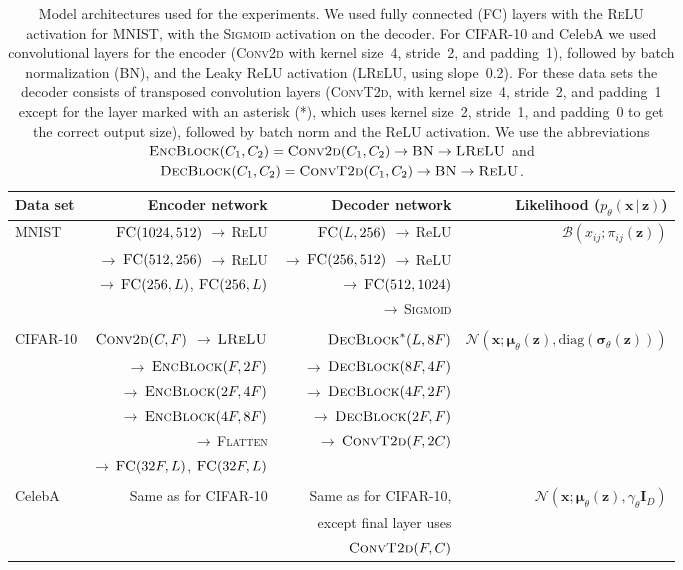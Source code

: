 \documentclass{article}
\newcommand{\bft}[1]{\mathbf{#1}}
\newcommand{\bfs}[1]{\boldsymbol{#1}}
\newcommand{\given}{\,|\,}
\begin{document}
\begin{table}[tb]
	\centering
	\caption{Model architectures used for the experiments. We used fully 
		connected (\textsc{FC}) layers with the \textsc{ReLU} 
		activation for MNIST, with the \textsc{Sigmoid} activation on 
		the decoder. For CIFAR-10 and CelebA we used convolutional 
		layers for the encoder (\textsc{Conv2d} with kernel size~4, 
		stride~2, and padding~1), followed by batch normalization 
		(\textsc{BN}), and the Leaky ReLU activation (\textsc{LReLU}, 
		using slope~0.2). For these data sets the decoder consists of 
		transposed convolution layers (\textsc{ConvT2d}, with kernel 
		size~4, stride~2, and padding~1 except for the layer marked 
		with an asterisk (*), which uses kernel size~2, stride~1, and 
		padding~0 to get the correct output size), followed by batch 
		norm and the ReLU activation.  We use the abbreviations 
		$\textsc{EncBlock}(C_1, C_2) = \textsc{Conv2d}(C_1, C_2) 
		\rightarrow \textsc{BN} \rightarrow \textsc{LReLU}$ and 
		$\textsc{DecBlock}(C_1, C_2) = \textsc{ConvT2d}(C_1, C_2) 
		\rightarrow \textsc{BN} \rightarrow \textsc{ReLU}$.}
	\label{tab:architectures}
	\def\RA{$\rightarrow\,$}
	\small
	\begin{tabular}{lrrr}
		\toprule
		Data set & Encoder network & Decoder network & Likelihood ($p_{\theta}(\bft{x} \given \bft{z})$) \\
		\midrule
		MNIST & $\textsc{FC}(1024, 512)$ \RA \textsc{ReLU} & $\textsc{FC}(L, 256)$ \RA ReLU & $\mathcal{B}(x_{ij}; \pi_{ij}(\bft{z}))$ \\
		      & \RA $\textsc{FC}(512, 256)$ \RA \textsc{ReLU} & \RA $\textsc{FC}(256, 512)$ \RA ReLU & \\
		      & \RA $\textsc{FC}(256, L)$, $\textsc{FC}(256, L)$ & \RA $\textsc{FC}(512, 1024)$ & \\
		      &                                                  & \RA \textsc{Sigmoid} & \\
		& & & \\
		CIFAR-10 & $\textsc{Conv2d}(C, F)$ \RA $\textsc{LReLU}$ & 
		$\textsc{DecBlock}^*(L, 8F)$ & $\mathcal{N}(\bft{x} ; 
		\bfs{\mu}_{\theta}(\bft{z}), 
		\text{diag}(\bfs{\sigma}_{\theta}(\bft{z})))$  \\
			 & \RA $\textsc{EncBlock}(F,  2F)$  & \RA $\textsc{DecBlock}(8F, 4F)$ & \\
			 & \RA $\textsc{EncBlock}(2F, 4F)$  & \RA $\textsc{DecBlock}(4F, 2F)$ & \\
			 & \RA $\textsc{EncBlock}(4F, 8F)$  & \RA $\textsc{DecBlock}(2F, F)$ & \\
			 & \RA \textsc{Flatten}  & \RA $\textsc{ConvT2d}(F, 2C)$ & \\
			 & \RA $\textsc{FC}(32F, L)$, $\textsc{FC}(32F, L)$ & & \\
		& & & \\
		CelebA & Same as for CIFAR-10 & Same as for CIFAR-10, & $\mathcal{N}(\bft{x} ; \bfs{\mu}_{\theta}(\bft{z}), \gamma_{\theta} \bft{I}_D)$ \\
		& & except final layer uses & \\
		& & $\textsc{ConvT2d}(F, C)$ & \\
		\bottomrule
	\end{tabular}
\end{table}
\end{document}
